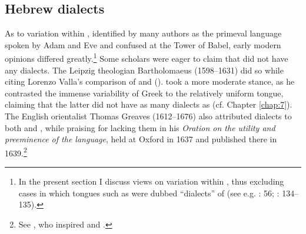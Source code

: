 \subsection{Hebrew dialects}

As to variation within , identified by many authors as the primeval language spoken by Adam and Eve and confused at the Tower of Babel, early modern opinions differed greatly.\footnote{In the present section I discuss views on variation within , thus excluding cases in which  tongues such as  were dubbed “dialects” of  (see e.g. \citealt{Bochart1646}: 56; \citealt{Martin1737}: 134–135).} Some scholars were eager to claim that  did not have any dialects. The Leipzig theologian Bartholomaeus (1598–1631) did so while citing Lorenzo Valla’s comparison of  and  (\citeyear[10]{Mayer1629}). \citet[\textsc{b.3}\textsc{\textsuperscript{v}}]{Junius1579} took a more moderate stance, as he contrasted the immense variability of Greek to the relatively uniform  tongue, claiming that the latter did not have as many dialects as  (cf. Chapter \ref{chap:7}). The English orientalist Thomas Greaves (1612–1676) also attributed dialects to both  and , while praising  for lacking them in his \textit{Oration on the utility and preeminence of the  language}, held at Oxford in 1637 and published there in 1639.\footnote{See \citet[19--20]{Greaves1639}, who inspired \citet[60]{Leigh1656} and \citet[73]{Blount1680}.}

